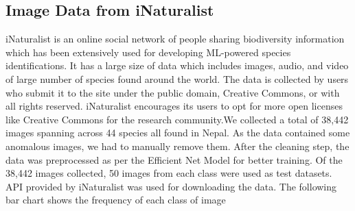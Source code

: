 \documentclass[fleqn, 10pt, twoside]{IOEGC}
\begin{document}
\subsection{Image Data from iNaturalist}
iNaturalist is an online social network of people sharing biodiversity information which has been extensively used for developing ML-powered species identifications. It has a large size of data which includes images, audio, and video of large number of species found around the world. The data is collected by users who submit it to the site under the public domain, Creative Commons, or with all rights reserved. iNaturalist encourages its users to opt for more open licenses like Creative Commons for the research community.We collected a total of 38,442 images spanning across 44 species all found in Nepal. As the data contained some anomalous images, we had to manually remove them. After the cleaning step, the data was preprocessed as per the Efficient Net Model for better training. Of the 38,442 images collected, 50 images from each class were used as test datasets.
API provided by iNaturalist was used for downloading the data. The following bar chart shows the frequency of each class of image
\end{document}
